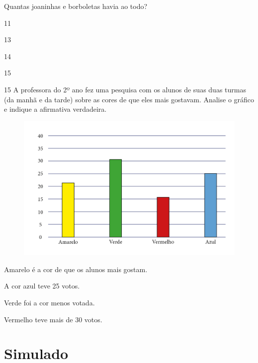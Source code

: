 Quantas joaninhas e borboletas havia ao todo?

\begin{escolha}[itemsep=-5pt]
\item 11

\item 13

\item 14

\item 15
\end{escolha}

\num{15} A professora do 2º ano fez uma pesquisa com os alunos de suas duas
turmas (da manhã e da tarde) sobre as cores de que eles mais gostavam.
Analise o gráfico e indique a afirmativa verdadeira.

\begin{figure}[H]
\includegraphics[width=\textwidth]{./media/image136.png}
\end{figure}

\begin{escolha}[itemsep=-5pt]
\item Amarelo é a cor de que os alunos mais gostam.

\item A cor azul teve 25 votos.

\item Verde foi a cor menos votada.

\item Vermelho teve mais de 30 votos.
\end{escolha}

\chapter[Simulado 3]{Simulado}

